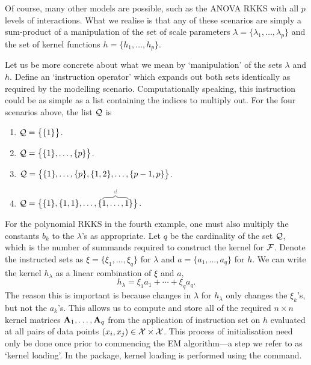 Of course, many other models are possible, such as the ANOVA RKKS with all $p$ levels of interactions.
What we realise is that any of these scenarios are simply a sum-product of a manipulation of the set of scale parameters $\lambda = \{\lambda_1,\dots,\lambda_p\}$ and the set of kernel functions $h = \{h_1,\dots,h_p\}$.

Let us be more concrete about what we mean by `manipulation' of the sets $\lambda$ and $h$.
Define an `instruction operator' which expands out both sets identically as required by the modelling scenario.
Computationally speaking, this instruction could be as simple as a list containing the indices to multiply out.
For the four scenarios above, the list ${\mathcal Q}$ is
\begin{enumerate}
  \item ${\mathcal Q} = \big\{ \{1\} \big\}$.
  \item ${\mathcal Q} = \big\{ \{1\},\dots,\{p\}\big\}$.
  \item  ${\mathcal Q} = \big\{ \{1\},\dots,\{p\},\{1,2\},\dots, \{p-1,p\}\big\}$.
  \item $\cQ = \big\{ \{1\},\{1,1\},\dots, \{\myoverbrace{1,\dots,1}{d}\}\big\}$.
\end{enumerate}
For the polynomial RKKS in the fourth example, one must also multiply the constants $b_k$ to the $\lambda$'s as appropriate.
Let $q$ be the cardinality of the set ${\mathcal Q}$, which is the number of summands required to construct the kernel for ${\mathcal F}$.
Denote the instructed sets as $\xi = \{\xi_1,\dots,\xi_q \}$ for $\lambda$ and $a = \{a_1,\dots,a_q\}$ for $h$.
We can write the kernel $h_\lambda$ as a linear combination of $\xi$ and $a$,
\[
  h_\lambda = \xi_1a_1 + \cdots + \xi_qa_q.
\]
The reason this is important is because changes in $\lambda$ for $h_\lambda$ only changes the $\xi_k$'s, but not the $a_k$'s.
This allows us to compute and store all of the required $n\times n$ kernel matrices ${\mathbf A}_1,\dots,{\mathbf A}_q$ from the application of instruction set on $h$ evaluated at all pairs of data points $(x_i,x_j)\in{\mathcal X}\times{\mathcal X}$.
This process of initialisation need only be done once prior to commencing the EM algorithm---a step we refer to as `kernel loading'.
In the  package, kernel loading is performed using the  command.

